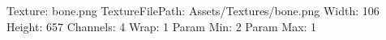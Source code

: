 Texture: bone.png
TextureFilePath: Assets/Textures/bone.png
Width: 106
Height: 657
Channels: 4
Wrap: 1
Param Min: 2
Param Max: 1